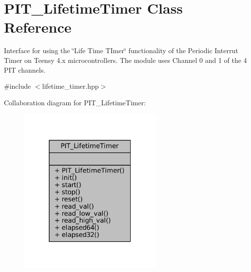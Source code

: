 \hypertarget{classPIT__LifetimeTimer}{}\section{P\+I\+T\+\_\+\+Lifetime\+Timer Class Reference}
\label{classPIT__LifetimeTimer}


Interface for using the \char`\"{}\+Life Time T\+Imer\char`\"{} functionality of the Periodic Interrut Timer on Teensy 4.\+x microcontrollers. The module uses Channel 0 and 1 of the 4 P\+IT channels.  




{\ttfamily \#include $<$lifetime\+\_\+timer.\+hpp$>$}



Collaboration diagram for P\+I\+T\+\_\+\+Lifetime\+Timer\+:\nopagebreak
\begin{figure}[H]
\begin{center}
\leavevmode
\includegraphics[width=205pt]{dc/d59/classPIT__LifetimeTimer__coll__graph}
\end{center}
\end{figure}
